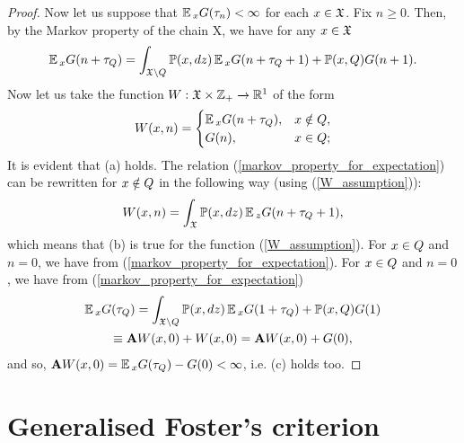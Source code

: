 \begin{proof}
		Now let us suppose that $\operatorname*{\mathbb{E}}{}_{x}G(\tau_{n}) < \infty$ for each $x \in \mathfrak{X}$. Fix $n \geq 0$. Then, by the Markov property of the chain X, we have for any $x \in \mathfrak{X}$
		\begin{gather}
		\operatorname*{\mathbb{E}}{}_{x}G(n + \tau_{Q}) = \int_{\mathfrak{X}\backslash Q}\operatorname*{\mathbb{P}}(x, dz)\operatorname*{\mathbb{E}}{}_{x}G(n + \tau_{Q} + 1) + \operatorname*{\mathbb{P}}(x, Q)G(n+1).
		\label{markov_property_for_expectation}
		\end{gather}
		Now let us take the function $W : \mathfrak{X} \times \mathbb{Z}_{+} \xrightarrow{} \mathbb{R}^{1}$ of the form
		\begin{gather}
		W(x, n) = \begin{cases}
		\operatorname*{\mathbb{E}}{}_{x}G(n + \tau_{Q}), & x \notin Q,\\
		G(n), & x \in Q;
		\end{cases}
		\label{W_assumption}
		\end{gather}
		It is evident that (a) holds. The relation (\ref{markov_property_for_expectation}) can be rewritten for $x \notin Q$ in the following way (using (\ref{W_assumption})):
		\begin{gather*}
		W(x, n) = \int_{\mathfrak{X}}\operatorname*{\mathbb{P}}(x, dz)\operatorname*{\mathbb{E}}{}_{z}G(n + \tau_{Q} + 1),
		\end{gather*}
		which means that (b) is true for the function (\ref{W_assumption}). For $x \in Q$ and $n = 0$, we have from (\ref{markov_property_for_expectation}). For $x \in Q$ and $n = 0$, we have from (\ref{markov_property_for_expectation})
		\begin{gather*}
		\operatorname*{\mathbb{E}}{}_{x}G(\tau_{Q}) = \int_{\mathfrak{X} \backslash Q}\operatorname*{\mathbb{P}}(x, dz)\operatorname*{\mathbb{E}}{}_{x}G(1 + \tau_{Q}) + \operatorname*{\mathbb{P}}(x, Q)G(1) \\ \equiv \mathbf{A}W(x, 0) + W(x, 0) = \mathbf{A}W(x, 0) + G(0),
		\end{gather*}
		and so, $\mathbf{A}W(x, 0) = \operatorname*{\mathbb{E}}{}_{x}G(\tau_{Q}) - G(0) < \infty$, i.e. (c) holds too.
	\end{proof}
	
	\newpage
	
	\section{Generalised Foster's criterion}
	\newcommand{\hffVar}{h} %
	\newcommand{\gffVar}{g} %
	\newcommand{\cefVar}{\mathcal{E}} %
	\newcommand{\indicator}{\mathds{1}} %
	
